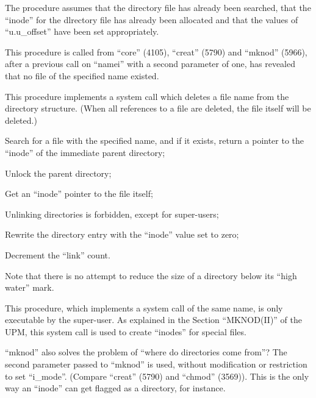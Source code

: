 The procedure assumes that  the  directory  file  has  already been searched,
that the ``inode'' for the dlrectory file
has already been allocated and that the
values of ``u.u\_offset''  have  been  set
appropriately.


This procedure is  called  from  ``core''
(4105),   ``creat''  (5790)  and  ``mknod''
(5966),  after  a  previous   call   on
``namei'' with a second parameter of one,
has revealed that no file of the specified name existed.



This procedure implements a system call
which  deletes  a  file  name  from the
directory structure.  (When all  references  to  a file are deleted, the file
itself will be deleted.)

\bd
\item[3515:] Search for a file with the specified
 name,  and  if  it  exists,
return a pointer to  the  ``inode''
of  the  immediate  parent directory;


\item[3518:] Unlock the parent directory;

\item[3519:] Get an  ``inode''  pointer  to  the
file itself;

\item[3522:] Unlinking directories is  forbidden, except for super-users;

\item[3528:] Rewrite the directory entry  with
      the ``inode'' value set to zero;

\item[3529:] Decrement the ``link'' count.
\ed


Note that there is no attempt to reduce
the size of a directory below its ``high
water'' mark.



This procedure, which implements a system call
of the same name, is only executable by the super-user. As explained
in  the Section ``MKNOD(II)'' of the UPM,
this system  call  is  used  to  create
``inodes'' for special files.

``mknod''  also  solves  the  problem  of
``where  do directories come from''?  The
second parameter passed to  ``mknod''  is
used,  without modification or restriction to set ``i\_mode''.
(Compare  ``creat'' (5790)  and  ``chmod''  (3569)).  This is
the only way an ``inode'' can get flagged
as a directory, for instance.

